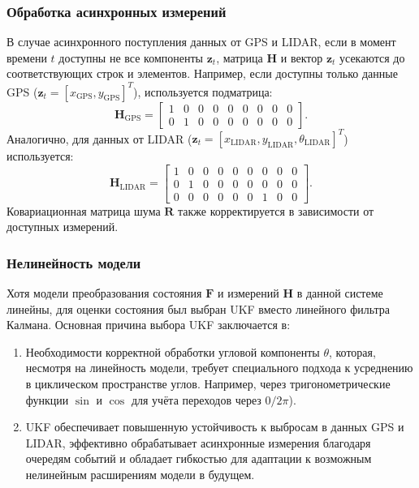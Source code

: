 \subsubsection{Обработка асинхронных измерений}
\hfill
\label{subsec:async_measurements}

В случае асинхронного поступления данных от GPS и LIDAR, если в момент времени \(t\) доступны 
не все компоненты \(\mathbf{z}_t\), 
матрица \(\mathbf{H}\) и вектор \(\mathbf{z}_t\) усекаются до соответствующих строк и элементов. 
Например, если доступны только данные GPS (\(\mathbf{z}_t = [x_{\text{GPS}}, y_{\text{GPS}}]^T\)), используется подматрица:
\[
\mathbf{H}_{\text{GPS}} =
\begin{bmatrix}
1 & 0 & 0 & 0 & 0 & 0 & 0 & 0 & 0 \\
0 & 1 & 0 & 0 & 0 & 0 & 0 & 0 & 0
\end{bmatrix}.
\]
Аналогично, для данных от LIDAR (\(\mathbf{z}_t = [x_{\text{LIDAR}}, y_{\text{LIDAR}}, \theta_{\text{LIDAR}}]^T\)) используется:
\[
\mathbf{H}_{\text{LIDAR}} =
\begin{bmatrix}
1 & 0 & 0 & 0 & 0 & 0 & 0 & 0 & 0 \\
0 & 1 & 0 & 0 & 0 & 0 & 0 & 0 & 0 \\
0 & 0 & 0 & 0 & 0 & 0 & 1 & 0 & 0
\end{bmatrix}.
\]
Ковариационная матрица шума \(\mathbf{R}\) также корректируется в зависимости от доступных измерений.


\subsubsection{Нелинейность модели}
\label{sec:ukf_choice}
\hfill

Хотя модели преобразования состояния \(\mathbf{F}\) и измерений \(\mathbf{H}\) в данной системе линейны,
для оценки состояния был выбран UKF вместо линейного фильтра Калмана. Основная причина выбора UKF заключается в:
\begin{enumerate}[label=\arabic*]
	\item Необходимости корректной обработки угловой компоненты \(\theta\), 
		которая, несмотря на линейность модели, требует специального подхода к усреднению в циклическом пространстве углов.
		Например, через тригонометрические функции \(\sin\) и \(\cos\) для учёта переходов через \(0/2\pi\)).
	\item UKF обеспечивает повышенную устойчивость к выбросам в данных GPS и LIDAR, 
		эффективно обрабатывает асинхронные измерения благодаря очередям событий и обладает гибкостью для адаптации к
		возможным нелинейным расширениям модели в будущем.
\end{enumerate}

